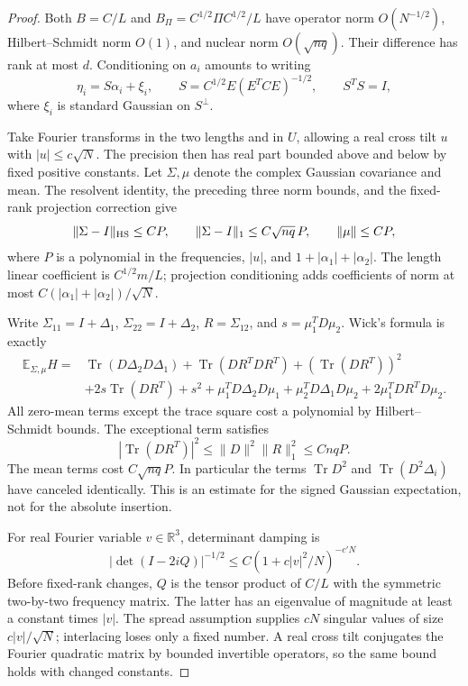 \begin{proof}
Both $B=C/L$ and $B_\Pi=C^{1/2}\Pi C^{1/2}/L$ have operator norm
$O(N^{-1/2})$, Hilbert--Schmidt norm $O(1)$, and nuclear norm
$O(\sqrt{nq})$. Their difference has rank at most $d$.
Conditioning on $a_i$ amounts to writing
\[
 \eta_i=S\alpha_i+\xi_i,\qquad
 S=C^{1/2}E(E^TCE)^{-1/2},\qquad S^TS=I,
\]
where $\xi_i$ is standard Gaussian on $S^\perp$.

Take Fourier transforms in the two lengths and in $U$, allowing a
real cross tilt $u$ with $|u|\le c\sqrt N$. The precision then has
real part bounded above and below by fixed positive constants.
Let $\Sigma,\mu$ denote the complex Gaussian covariance and mean.
The resolvent identity, the preceding three norm bounds, and the
fixed-rank projection correction give
\[
 \|\Sigma-I\|_{\rm HS}\le CP,\qquad
 \|\Sigma-I\|_1\le C\sqrt{nq}\,P,\qquad \|\mu\|\le CP,
\]
where $P$ is a polynomial in the frequencies, $|u|$, and
$1+|\alpha_1|+|\alpha_2|$. The length linear coefficient is
$C^{1/2}m/L$; projection conditioning adds coefficients of norm
at most $C(|\alpha_1|+|\alpha_2|)/\sqrt N$.

Write $\Sigma_{11}=I+\Delta_1$, $\Sigma_{22}=I+\Delta_2$,
$R=\Sigma_{12}$, and $s=\mu_1^TD\mu_2$. Wick's formula is exactly
\begin{align*}
 \mathbb E_{\Sigma,\mu}H={}&
 \operatorname{Tr}(D\Delta_2D\Delta_1)
 +\operatorname{Tr}(DR^TDR^T)+(\operatorname{Tr}(DR^T))^2\\
 &+2s\operatorname{Tr}(DR^T)+s^2
 +\mu_1^TD\Delta_2D\mu_1+\mu_2^TD\Delta_1D\mu_2
 +2\mu_1^TDR^TD\mu_2.
\end{align*}
All zero-mean terms except the trace square cost a polynomial by
Hilbert--Schmidt bounds. The exceptional term satisfies
\[
 |\operatorname{Tr}(DR^T)|^2\le\|D\|^2\|R\|_1^2\le CnqP.
\]
The mean terms cost $C\sqrt{nq}P$. In particular the terms
$\operatorname{Tr}D^2$ and $\operatorname{Tr}(D^2\Delta_i)$
have canceled identically. This is an estimate for the signed
Gaussian expectation, not for the absolute insertion.

For real Fourier variable $v\in\mathbb R^3$, determinant damping is
\[
 |\det(I-2iQ)|^{-1/2}\le C(1+c|v|^2/N)^{-c'N}.
\]
Before fixed-rank changes, $Q$ is the tensor product of $C/L$ with
the symmetric two-by-two frequency matrix. The latter has an
eigenvalue of magnitude at least a constant times $|v|$. The spread
assumption supplies $cN$ singular values of size $c|v|/\sqrt N$;
interlacing loses only a fixed number. A real cross tilt conjugates
the Fourier quadratic matrix by bounded invertible operators, so
the same bound holds with changed constants.


\end{proof}
